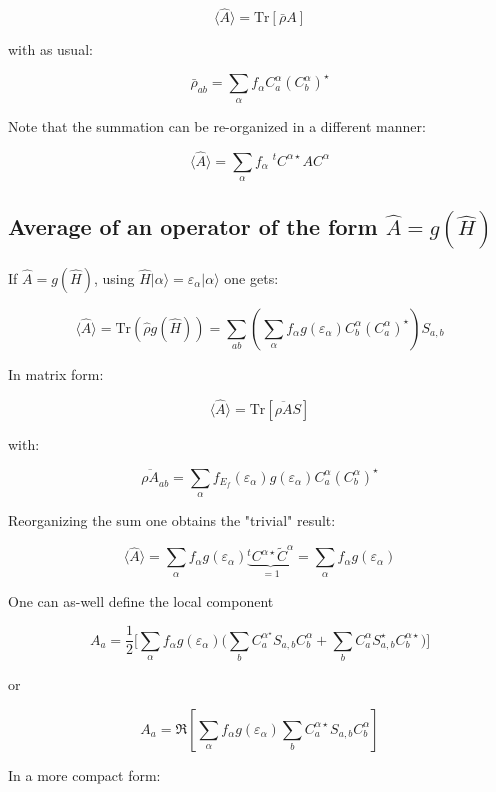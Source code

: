 \documentclass{article}
\newcommand{\ket}[1]{|#1\rangle}
\newcommand{\op}[1]{\hat{#1}}
\begin{document}
\[  \langle\op{A}  \rangle= \text{Tr} \left[\bar{\rho}A\right] \]

\noindent
with as usual:

\[ \bar{\rho}_{a b}=  \sum_{\alpha}  f_{\alpha} C_{a }^{\alpha}(C_{b}^{\alpha})^{\star}    \]

\noindent
Note that the summation can be re-organized in a different manner:

\[\langle\op{A}  \rangle=\sum_{\alpha} f_{\alpha} \; ^tC^{\alpha \star} A C^{\alpha} \]

\subsection{Average of an operator of the form $\op{A}=g(\op{H})$}

\noindent
If $\op{A}=g(\op{H})$, using
$\op{H}\ket{\alpha}=\varepsilon_{\alpha}\ket{\alpha}$ 
one gets:


\[ \langle\op{A}  \rangle =\mbox{Tr} (\op{\rho} g(\op{H}))= 
\sum_{ a  b }\left(\sum_{\alpha}  f_{\alpha}g(\varepsilon_{\alpha})
 C_{b}^{\alpha}(C_{a}^{\alpha})^{\star} \right)  S_{a,b} \]


\noindent
In matrix form:

\[\langle\op{A}  \rangle = \mbox{Tr} \left[ \overline{\rho A}  S \right] \] 


\noindent
with:

\[ \overline{\rho A}_{ab}=\sum_{\alpha}  f_{E_f}(\varepsilon_{\alpha})g(\varepsilon_{\alpha})
 C_{a}^{\alpha}(C_{b}^{\alpha})^{\star}\]

\noindent
Reorganizing the sum one obtains the "trivial" result:

\[\langle\op{A}  \rangle =\sum_{\alpha } 
f_{\alpha} g(\varepsilon_{\alpha}) \underbrace{^tC^{\alpha \star}\widetilde{C}^{\alpha}}_{=1}=
\sum_{\alpha } 
f_{\alpha} g(\varepsilon_{\alpha}) \]

\noindent
One can as-well define the local component

\[ {A}_{a}=\frac{1}{2}\Bigg[\sum_{\alpha} 
f_{\alpha}g(\varepsilon_{\alpha}) 
\Bigg(\sum_{b} C_{a}^{\alpha^{\star}}S_{a,b}C_{b}^{\alpha} + \sum_{b} C_{a}^{\alpha}S_{a,b}^{\star}C_{b}^{\alpha \star}\Bigg) \Bigg]\]

\noindent
or

\[ {A}_{a }=\Re \left[ 
\sum_{\alpha}  f_{\alpha}g(\varepsilon_{\alpha}) 
\sum_{b} C_{a}^{\alpha \star} S_{a,b}C_{b}^{\alpha} \right] \]

\noindent
In a more compact form:
\end{document}
